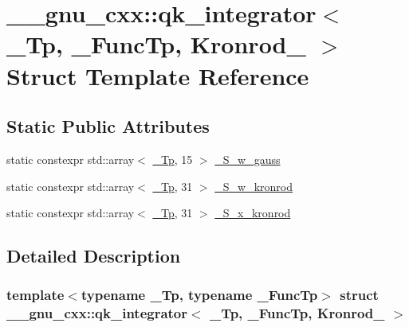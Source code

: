 \hypertarget{struct____gnu__cxx_1_1qk__integrator_3_01__Tp_00_01__FuncTp_00_01Kronrod__61_01_4}{}\section{\+\_\+\+\_\+gnu\+\_\+cxx\+:\+:qk\+\_\+integrator$<$ \+\_\+\+Tp, \+\_\+\+Func\+Tp, Kronrod\+\_ $>$ Struct Template Reference}
\label{struct____gnu__cxx_1_1qk__integrator_3_01__Tp_00_01__FuncTp_00_01Kronrod__61_01_4}
\subsection*{Static Public Attributes}
\begin{DoxyCompactItemize}
\item 
static constexpr std\+::array$<$ \hyperlink{namespace____gnu__cxx_a3b19a9c800ca194374ef9172290f7d79}{\+\_\+\+Tp}, 15 $>$ \hyperlink{struct____gnu__cxx_1_1qk__integrator_3_01__Tp_00_01__FuncTp_00_01Kronrod__61_01_4_aca2625a4a4a68167b09220e0a552f654}{\+\_\+\+S\+\_\+w\+\_\+gauss}
\item 
static constexpr std\+::array$<$ \hyperlink{namespace____gnu__cxx_a3b19a9c800ca194374ef9172290f7d79}{\+\_\+\+Tp}, 31 $>$ \hyperlink{struct____gnu__cxx_1_1qk__integrator_3_01__Tp_00_01__FuncTp_00_01Kronrod__61_01_4_ac046047cb64928f79d4a76cb64b58da6}{\+\_\+\+S\+\_\+w\+\_\+kronrod}
\item 
static constexpr std\+::array$<$ \hyperlink{namespace____gnu__cxx_a3b19a9c800ca194374ef9172290f7d79}{\+\_\+\+Tp}, 31 $>$ \hyperlink{struct____gnu__cxx_1_1qk__integrator_3_01__Tp_00_01__FuncTp_00_01Kronrod__61_01_4_a8ecea92a219b905f30f34fe0c8ab0063}{\+\_\+\+S\+\_\+x\+\_\+kronrod}
\end{DoxyCompactItemize}


\subsection{Detailed Description}
\subsubsection*{template$<$typename \+\_\+\+Tp, typename \+\_\+\+Func\+Tp$>$\newline
struct \+\_\+\+\_\+gnu\+\_\+cxx\+::qk\+\_\+integrator$<$ \+\_\+\+Tp, \+\_\+\+Func\+Tp, Kronrod\+\_ $>$}

